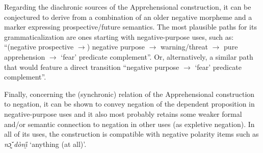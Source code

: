 \documentclass[output=paper,colorlinks,citecolor=brown]{langscibook}
\begin{document}
Regarding the diachronic sources of the Apprehensional construction, it can be conjectured to derive from a combination of an older negative morpheme and a marker expressing prospective\slash future semantics. The most plausible paths for its grammaticalization are ones starting with negative-purpose uses, such as: ``(negative prospective $\rightarrow$) negative purpose $\rightarrow$ warning\slash threat $\rightarrow$ pure apprehension $\rightarrow$ `fear' predicate complement''. Or, alternatively, a similar path that would feature a direct transition ``negative purpose $\rightarrow$ `fear' predicate complement''.

Finally, concerning the (synchronic) relation of the Apprehensional construction to negation, it can be shown to convey negation of the dependent proposition in negative-purpose uses and it also most probably retains some weaker formal and/or semantic connection to negation in other uses (as expletive negation). In all of its uses, the construction is compatible with negative polarity items such as \textit{nɔ̰̌ dònı̰̋} `anything (at all)'.
\end{document}
